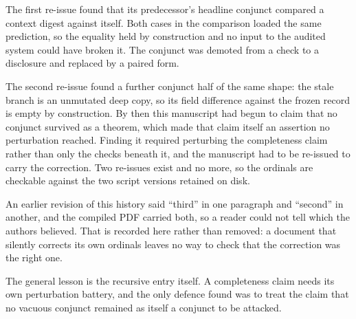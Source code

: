 \documentclass[11pt]{article}
\begin{document}
The first re-issue found that its predecessor's headline conjunct compared a context digest against itself. Both cases in the comparison loaded the same prediction, so the equality held by construction and no input to the audited system could have broken it. The conjunct was demoted from a check to a disclosure and replaced by a paired form.

The second re-issue found a further conjunct half of the same shape: the stale branch is an unmutated deep copy, so its field difference against the frozen record is empty by construction. By then this manuscript had begun to claim that no conjunct survived as a theorem, which made that claim itself an assertion no perturbation reached. Finding it required perturbing the completeness claim rather than only the checks beneath it, and the manuscript had to be re-issued to carry the correction. Two re-issues exist and no more, so the ordinals are checkable against the two script versions retained on disk.

An earlier revision of this history said ``third'' in one paragraph and ``second'' in another, and the compiled PDF carried both, so a reader could not tell which the authors believed. That is recorded here rather than removed: a document that silently corrects its own ordinals leaves no way to check that the correction was the right one.

The general lesson is the recursive entry itself. A completeness claim needs its own perturbation battery, and the only defence found was to treat the claim that no vacuous conjunct remained as itself a conjunct to be attacked.
\end{document}
